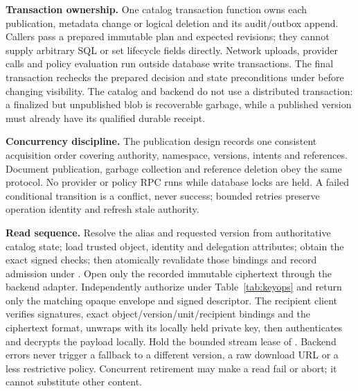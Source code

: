 \textbf{Transaction ownership.} One catalog transaction function owns each publication, metadata change or logical deletion and its audit/outbox append. Callers pass a prepared immutable plan and expected revisions; they cannot supply arbitrary SQL or set lifecycle fields directly. Network uploads, provider calls and policy evaluation run outside database write transactions. The final transaction rechecks the prepared decision and state preconditions under  before changing visibility. The catalog and backend do not use a distributed transaction: a finalized but unpublished blob is recoverable garbage, while a published version must already have its qualified durable receipt.

\textbf{Concurrency discipline.} The publication design records one consistent acquisition order covering authority, namespace, versions, intents and references. Document publication, garbage collection and reference deletion obey the same protocol. No provider or policy RPC runs while database locks are held. A failed conditional transition is a conflict, never success; bounded retries preserve operation identity and refresh stale authority.

\textbf{Read sequence.} Resolve the alias and requested version from authoritative catalog state; load trusted object, identity and delegation attributes; obtain the exact signed checks; then atomically revalidate those bindings and record admission under . Open only the recorded immutable ciphertext through the backend adapter. Independently authorize  under Table~\ref{tab:keyops} and return only the matching opaque envelope and signed descriptor. The recipient client verifies signatures, exact object/version/unit/recipient bindings and the ciphertext format, unwraps with its locally held private key, then authenticates and decrypts the payload locally. Hold the bounded stream lease of . Backend errors never trigger a fallback to a different version, a raw download URL or a less restrictive policy. Concurrent retirement may make a read fail or abort; it cannot substitute other content.

